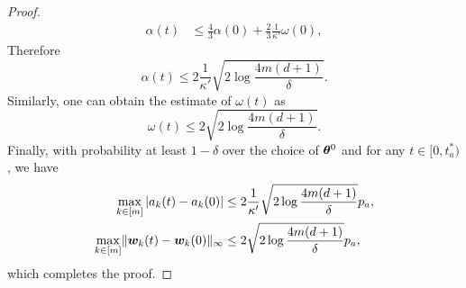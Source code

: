 \documentclass[twoside,11pt]{article}
\begin{document}
\begin{proof}
\begin{align*}
        \alpha(t) & \leq\frac{4}{3}\alpha(0)+\frac{2}{3}\frac{1}{\kappa'}\omega(0),
    \end{align*}
    Therefore
    \begin{equation*}
        \alpha(t)\leq 2\frac{1}{\kappa'}\sqrt{2\log\frac{4m(d+1)}{\delta}}.
    \end{equation*}
    Similarly, one can obtain the estimate of $\omega(t)$ as
    \begin{equation*}
        \omega(t)\leq 2\sqrt{2\log\frac{4m(d+1)}{\delta}}.
    \end{equation*}
    Finally, with probability at least $1-\delta$ over the choice of $\bm{\theta}^0$ and for any $t\in[0, t^*_a)$, we have
    \begin{equation*}
        \begin{aligned}
            \max\limits_{k\in[m]}|a_k(t) - a_k(0)|
             & \leq 2\frac{1}{\kappa'}\sqrt{2\log\frac{4m(d+1)}{\delta}}p_a, \\
            \max\limits_{k\in[m]}\lVert\bm{w}_k(t) - \bm{w}_k(0)\rVert_{\infty}
             & \leq 2\sqrt{2\log\frac{4m(d+1)}{\delta}}p_a,
        \end{aligned}
    \end{equation*}
    which completes the proof.
\end{proof}
\end{document}
